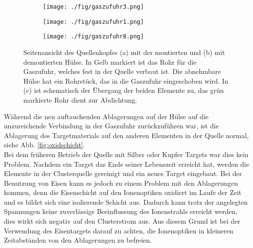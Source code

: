 \begin{figure}
  \begin{subfigure}[h]{0.8\textwidth}
    \texttt{[image: ./fig/gaszufuhr3.png]}
    \caption{}
    \label{fig:huelse1}
  \end{subfigure}
  \begin{subfigure}[h]{0.8\textwidth}
    \texttt{[image: ./fig/gaszufuhr1.png]}
    \caption{}
    \label{fig:huelse2}
  \end{subfigure}
  \begin{subfigure}[h]{0.8\textwidth}
    \texttt{[image: ./fig/gaszufuhr8.png]}
    \caption{}
    \label{fig:huelse4}
  \end{subfigure}
  \caption{Seitenansicht des Quellenkopfes (a) mit der montierten und (b) mit demontierten Hülse. In Gelb markiert ist das Rohr für die Gaszufuhr, welches fest in der Quelle verbaut ist. Die abnehmbare Hülse hat ein Rohrstück, das in die Gaszufuhr eingeschoben wird. In (c) ist schematisch der Übergang der beiden Elemente zu, das grün markierte Rohr dient zur Abdichtung.}
  \label{fig:huelse5}
\end{figure}
Während die neu auftauchenden Ablagerungen auf der Hülse auf die unzureichende Verbindung in der Gaszufuhr zurückzuführen war, ist die Ablagerung des Targetmaterials auf den anderen Elementen in der Quelle normal, siehe Abb. \ref{fig:oxidschicht}.\\
Bei dem früheren Betrieb der Quelle mit Silber oder Kupfer Targets war dies kein Problem.
Nachdem ein Target das Ende seiner Lebenszeit erreicht hat, werden die Elemente in der Clusterquelle gereinigt und ein neues Target eingebaut.
Bei der Benutzung von Eisen kann es jedoch zu einem Problem mit den Ablagerungen kommen, denn die Eisenschicht auf den Ionenoptiken oxidiert im Laufe der Zeit und es bildet sich eine isolierende Schicht aus.
Dadurch kann trotz der angelegten Spannungen keine zuverlässige Beeinflussung des Ionenstrahls erreicht werden, dies wirkt sich negativ auf den Clusterstrom aus.
Aus diesem Grund ist bei der Verwendung des Eisentargets darauf zu achten, die Ionenoptiken in kleineren Zeitabständen von den Ablagerungen zu befreien.
